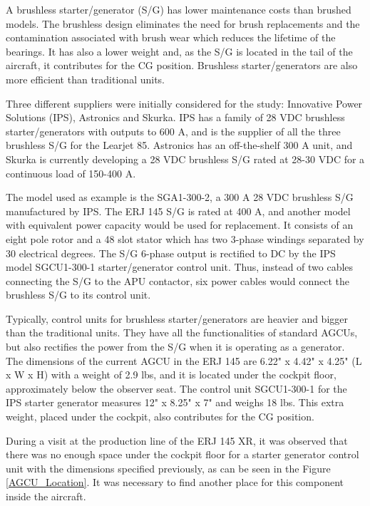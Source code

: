 ﻿%
A brushless starter/generator (S/G) has lower maintenance costs than brushed models. The brushless design eliminates the need for brush replacements and the contamination associated with brush wear which reduces the lifetime of the bearings. It has also a lower weight and, as the S/G is located in the tail of the aircraft, it contributes for the CG position. Brushless starter/generators are also more efficient than traditional units.

Three different suppliers were initially considered for the study: Innovative Power Solutions (IPS), Astronics and Skurka. IPS has a family of 28 VDC brushless starter/generators with outputs to 600 A, and is the supplier of all the three brushless S/G for the Learjet 85. Astronics has an off-the-shelf 300 A unit, and Skurka is currently developing a 28 VDC brushless S/G rated at 28-30 VDC for a continuous load of 150-400 A.

The model used as example is the SGA1-300-2, a 300 A 28 VDC brushless S/G manufactured by IPS. The ERJ 145 S/G is rated at 400 A, and another model with equivalent power capacity would be used for replacement. It consists of an eight pole rotor and a 48 slot stator which has two 3-phase windings separated by 30 electrical degrees. The S/G 6-phase output is rectified to DC by the IPS model SGCU1-300-1 starter/generator control unit. Thus, instead of two cables connecting the S/G to the APU contactor, six power cables would connect the brushless S/G to its control unit.

Typically, control units for brushless starter/generators are heavier and bigger than the traditional units. They have all the functionalities of standard AGCUs, but also rectifies the power from the S/G when it is operating as a generator. The dimensions of the current AGCU in the ERJ 145 are 6.22" x 4.42" x 4.25" (L x W x H) with a weight of 2.9 lbs, and it is located under the cockpit floor, approximately below the observer seat. The control unit SGCU1-300-1 for the IPS starter generator measures 12" x 8.25" x 7" and weighs 18 lbs. This extra weight, placed under the cockpit, also contributes for the CG position.

During a visit at the production line of the ERJ 145 XR, it was observed that there was no enough space under the cockpit floor for a starter generator control unit with the dimensions specified previously, as can be seen in the Figure \ref{AGCU_Location}. It was necessary to find another place for this component inside the aircraft.

